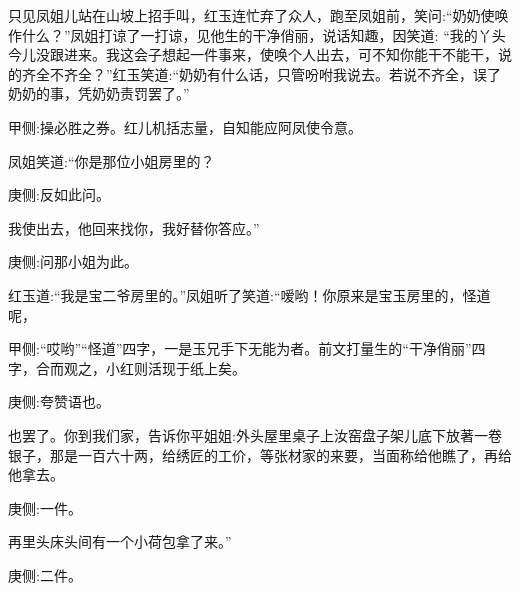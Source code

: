 \begin{parag}
    只见凤姐儿站在山坡上招手叫，红玉连忙弃了众人，跑至凤姐前，笑问:“奶奶使唤作什么？”凤姐打谅了一打谅，见他生的干净俏丽，说话知趣，因笑道: “我的丫头今儿没跟进来。我这会子想起一件事来，使唤个人出去，可不知你能干不能干，说的齐全不齐全？”红玉笑道:“奶奶有什么话，只管吩咐我说去。若说不齐全，误了奶奶的事，凭奶奶责罚罢了。”\begin{note}甲侧:操必胜之券。红儿机括志量，自知能应阿凤使令意。\end{note}凤姐笑道:“你是那位小姐房里的？\begin{note}庚侧:反如此问。\end{note}我使出去，他回来找你，我好替你答应。”\begin{note}庚侧:问那小姐为此。\end{note}红玉道:“我是宝二爷房里的。”凤姐听了笑道:“嗳哟！你原来是宝玉房里的，怪道呢，\begin{note}甲侧:“哎哟”“怪道”四字，一是玉兄手下无能为者。前文打量生的“干净俏丽”四字，合而观之，小红则活现于纸上矣。\end{note}\begin{note}庚侧:夸赞语也。\end{note}也罢了。你到我们家，告诉你平姐姐:外头屋里桌子上汝窑盘子架儿底下放著一卷银子，那是一百六十两，给绣匠的工价，等张材家的来要，当面称给他瞧了，再给他拿去。\begin{note}庚侧:一件。\end{note}再里头床头间有一个小荷包拿了来。”\begin{note}庚侧:二件。\end{note}
\end{parag}


